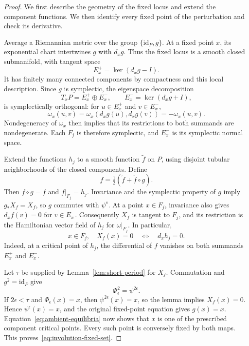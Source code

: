 \begin{proof}
We first describe the geometry of the fixed locus and extend the component
functions.  We then identify every fixed point of the perturbation and
check its derivative.

Average a Riemannian metric over the group $\{\mathrm{id}_P,g\}$.  At a fixed
point $x$, its exponential chart intertwines $g$ with $d_xg$.  Thus the fixed
locus is a smooth closed submanifold, with tangent space
\[
  E_x^+=\ker(d_xg-I).
\]
It has finitely many connected components by compactness and this local
description.  Since $g$ is symplectic, the eigenspace decomposition
\[
  T_xP=E_x^+\oplus E_x^-,
  \qquad E_x^-=\ker(d_xg+I),
\]
is symplectically orthogonal: for $u\in E_x^+$ and $v\in E_x^-$,
\[
  \omega_x(u,v)
    =\omega_x(d_xg(u),d_xg(v))=-\omega_x(u,v).
\]
Nondegeneracy of $\omega_x$ then implies that its restrictions to both
summands are nondegenerate.  Each $F_j$ is therefore symplectic, and
$E_x^-$ is its symplectic normal space.

Extend the functions $h_j$ to a smooth function $\widetilde f$ on $P$, using
disjoint tubular neighborhoods of the closed components.  Define
\[
  f=\tfrac12(\widetilde f+\widetilde f\circ g).
\]
Then $f\circ g=f$ and $f|_{F_j}=h_j$.  Invariance and the symplectic property
of $g$ imply $g_*X_f=X_f$, so $g$ commutes with $\psi^s$.  At a point
$x\in F_j$, invariance also gives $d_xf(v)=0$ for $v\in E_x^-$.  Consequently
$X_f$ is tangent to $F_j$, and its restriction is the Hamiltonian vector
field of $h_j$ for $\omega|_{F_j}$.  In particular,
\begin{equation}\label{eq:ambient-equilibria}
  x\in F_j,\quad X_f(x)=0
  \quad\Longleftrightarrow\quad d_xh_j=0.
\end{equation}
Indeed, at a critical point of $h_j$, the differential of $f$ vanishes on
both summands $E_x^+$ and $E_x^-$.

Let $\tau$ be supplied by Lemma~\ref{lem:short-period} for $X_f$.  Commutation
and $g^2=\mathrm{id}_P$ give
\[
  \Phi_\epsilon^2=\psi^{2\epsilon}.
\]
If $2\epsilon<\tau$ and $\Phi_\epsilon(x)=x$, then
$\psi^{2\epsilon}(x)=x$, so the lemma implies $X_f(x)=0$.  Hence
$\psi^\epsilon(x)=x$, and the original fixed-point equation gives $g(x)=x$.
Equation~\eqref{eq:ambient-equilibria} now shows that $x$ is one of the
prescribed component critical points.  Every such point is conversely
fixed by both maps.  This proves~\eqref{eq:involution-fixed-set}.


\end{proof}
